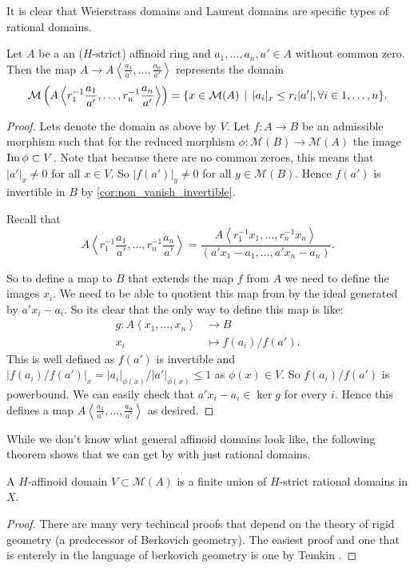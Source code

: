 It is clear that Weierstrass domains and Laurent domains are specific types of rational domains. 
\begin{proposition}
	Let $A$ be a an ($H$-strict) affinoid ring and $a_1, \ldots, a_n, a' \in A$ without common zero.
	Then the map $A \to A\left<\frac{a_1}{a'}, \ldots, \frac{a_n}{a'} \right>$ represents the domain \[
		\mathcal{M} \left(A \left<r^{-1}_1\frac{a_1}{a'}, \ldots, r^{-1}_n\frac{a_n}{a'}\right> \right) = \{x \in \mathcal{M} (A) \st |a_i|_x \le r_i|a'|, \forall i \in 1, \ldots, n\} 
	.\] 
\end{proposition}
\begin{proof}
	Lets denote the domain as above by $V$. 
	Let $f:A \to B$ be an admissible morphism such that for the reduced morphism $\phi: \mathcal{M} (B) \to \mathcal{M} (A)$ the image $\operatorname{Im} \phi \subset  V$.
	Note that because there are no common zeroes, this means that $|a'|_x \ne 0$ for all $x \in V$. 
	So $|f(a')|_{y} \ne 0$ for all $y \in \mathcal{M} (B)$. 
	Hence $f(a')$ is invertible in $B$ by \cref{cor:non_vanish_invertible}. 

	Recall that \[
	A\left<r^{-1}_1\frac{a_1}{a'}, \ldots, r_n^{-1}\frac{a_n}{a'} \right> = \frac{A\left<r_1^{-1}x_1, \ldots, r_n^{-1}x_n \right>}{(a' x_1 - a_1, \ldots, a' x_n - a_n)}
	.\] 

	So to define a map to $B$ that extends the map $f$ from $A$ we need to define the images $x_i$. 
	We need to be able to quotient this map from by the ideal generated by $a'x_i - a_i$. 
	So its clear that the only way to define this map is like:
	\begin{align*}
		g: A\left<x_1, \ldots, x_n \right> &\longrightarrow B \\
		x_i &\longmapsto f(a_i) / f(a')
	.\end{align*}
	This is well defined as $f(a')$ is invertible and $|f(a_i) / f(a')|_x = |a_i|_{\phi(x)} / |a'|_{\phi(x)} \le 1$ as $\phi(x) \in V$. 
	So $f(a_i) / f(a')$ is powerbound. 
	We can easily check that $a'x_i - a_i \in \ker g$ for every $i$. Hence this defines a map $A \left<\frac{a_1}{a'}, \ldots, \frac{a_n}{a'} \right>$ as desired. 
\end{proof}

While we don't know what general affinoid domains look like, the following theorem shows that we can get by with just rational domains. 
\begin{proposition}
	A $H$-affinoid domain $V \subset  \mathcal{M} (A)$ is a finite union of $H$-strict rational domains in $X$.
\end{proposition}
\begin{proof}
	There are many very techincal proofs that depend on the theory of rigid geometry (a predecessor of Berkovich geometry).
	The easiest proof and one that is enterely in the language of berkovich geometry is one by Temkin \cite{temkinNewProofGerritzenGrauert2005}.
\end{proof}


